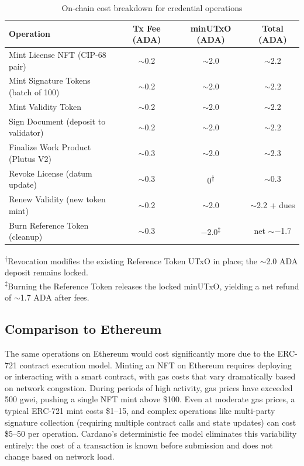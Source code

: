 \begin{table}[htbp]
\centering
\caption{On-chain cost breakdown for credential operations}
\label{tab:ch5-costs}
\small
\begin{tabular}{@{}p{4.5cm}ccc@{}}
\toprule
\textbf{Operation} & \textbf{Tx Fee (ADA)} & \textbf{minUTxO (ADA)} & \textbf{Total (ADA)} \\
\midrule
Mint License NFT (CIP-68 pair) & $\sim$0.2 & $\sim$2.0 & $\sim$2.2 \\
Mint Signature Tokens (batch of 100) & $\sim$0.2 & $\sim$2.0 & $\sim$2.2 \\
Mint Validity Token & $\sim$0.2 & $\sim$2.0 & $\sim$2.2 \\
Sign Document (deposit to validator) & $\sim$0.2 & $\sim$2.0 & $\sim$2.2 \\
Finalize Work Product (Plutus V2) & $\sim$0.3 & $\sim$2.0 & $\sim$2.3 \\
Revoke License (datum update) & $\sim$0.3 & 0\textsuperscript{$\dagger$} & $\sim$0.3 \\
Renew Validity (new token mint) & $\sim$0.2 & $\sim$2.0 & $\sim$2.2 + dues \\
Burn Reference Token (cleanup) & $\sim$0.3 & $-$2.0\textsuperscript{$\ddagger$} & net $\sim$$-$1.7 \\
\bottomrule
\end{tabular}

\vspace{4pt}
\footnotesize
\textsuperscript{$\dagger$}Revocation modifies the existing Reference Token UTxO in place; the $\sim$2.0 ADA deposit remains locked.\\
\textsuperscript{$\ddagger$}Burning the Reference Token releases the locked minUTxO, yielding a net refund of $\sim$1.7 ADA after fees.
\end{table}

\subsection{Comparison to Ethereum}

The same operations on Ethereum would cost significantly more due to the ERC-721 contract execution model. Minting an NFT on Ethereum requires deploying or interacting with a smart contract, with gas costs that vary dramatically based on network congestion. During periods of high activity, gas prices have exceeded 500 gwei, pushing a single NFT mint above \$100. Even at moderate gas prices, a typical ERC-721 mint costs \$1--15, and complex operations like multi-party signature collection (requiring multiple contract calls and state updates) can cost \$5--50 per operation. Cardano's deterministic fee model eliminates this variability entirely: the cost of a transaction is known before submission and does not change based on network load.


